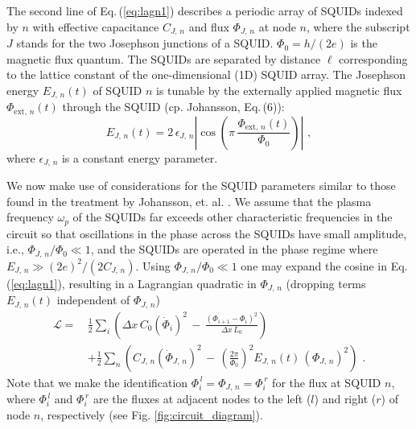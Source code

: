 The second line of Eq.\,(\ref{eq:lagn1}) describes a periodic array of SQUIDs indexed by $n$ 
with effective capacitance $C_{J,\,n}$ and flux $\Phi_{J,\,n}$ at node $n$, where 
the subscript $J$ stands for the two Josephson junctions of a SQUID.
$\Phi_0 = h / (2 e)$ is the magnetic flux quantum.
The SQUIDs are separated by 
distance $\ell$ corresponding to the lattice constant of the one-dimensional (1D) SQUID array. 
The Josephson energy $E_{J,\,n}(t)$ of SQUID $n$ is tunable
by the externally applied magnetic flux $\Phi_{\text{ext},\,n}(t)$ through the SQUID 
(cp. Johansson, Eq.\,(6)): 
%
\begin{equation} \label{eq:squidenergy}
    E_{J,\,n}(t) = 2 \, \epsilon_{J,\,n} 
    \left\vert \cos\left(\pi \, \frac{\Phi_{\text{ext},\,n}(t)}{\Phi_0}\right)\right\vert \, \, ,
\end{equation}
%
where $\epsilon_{J,\,n}$ is a constant energy parameter.

We now make use of considerations for the SQUID parameters similar to those found in the treatment by Johansson, et. al. \cite{Johansson2010}.
We assume that the plasma frequency $\omega_p$ of the SQUIDs far exceeds other characteristic frequencies 
in the circuit so that oscillations in the phase across the SQUIDs have small amplitude, i.e., 
$\Phi_{J,\,n} / \Phi_0 \ll 1$,
and the SQUIDs are operated in the phase regime where $E_{J,\,n} \gg (2e)^2 / (2C_{J,\,n})$.
Using $\Phi_{J,\,n} / \Phi_0 \ll 1$ one may expand the cosine in Eq.\,(\ref{eq:lagn1}), 
resulting in a Lagrangian quadratic in $\Phi_{J,\,n}$ (dropping terms $E_{J,\,n}(t)$ 
independent of $\Phi_{J,\,n}$)
%
\begin{equation} \label{eq:lagn2}
\begin{split}
\mathcal{L} = \, & \frac{1}{2} \sum_i \left( \Delta x \, C_{0} \left(\dot{\Phi}_{i}\right)^{2} \, - \, 
\frac{\left(\Phi_{i+1}-\Phi_{i}\right)^{2}}{\Delta x \, L_{0}} \right)  \\[2mm]
& + \frac{1}{2} \sum_n \left( C_{J,\,n} \left(\dot{\Phi}_{J,\,n} \right)^{2} \, - \, 
 \left(\frac{2 \pi}{\Phi_0} \right)^2 E_{J,\,n}(t) \, \left( \Phi_{J,\,n} \right)^2 
\right) \, \, .
\end{split}
\end{equation}
%
Note that we make the identification $\Phi_i^{\,l} = \Phi_{J,\,n} = \Phi_i^{\,r}$ for the flux at SQUID $n$, 
where $\Phi_i^{\,l}$ and $\Phi_i^{\,r}$ are the fluxes at adjacent nodes to the left ($l$) and right ($r$) of 
node $n$, respectively (see Fig. \ref{fig:circuit_diagram}). 


